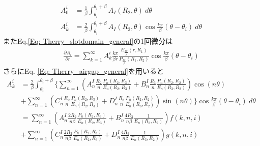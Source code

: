 \documentclass[a4paper, 11pt]{article}
\begin{document}
\begin{align}
    A_0^i &= \frac{1}{\beta} \int_{\theta_i}^{\theta_i+\beta} A_I (R_2,\theta) ~d\theta\\
    A_k^i &= \frac{2}{\beta} \int_{\theta_i}^{\theta_i+\beta} A_I (R_2,\theta)\cos \frac{k\pi}{\beta}(\theta-\theta_i)~d\theta
\end{align}
\color{NavyBlue}
またEq.\eqref{Eq: Therry_slotdomain_general}の1回微分は
\begin{align}
     \frac{\partial A_i}{\partial r}  = \sum_{k=1}^\infty A_k^i \frac{k\pi}{\beta r}\frac{E_{\frac{k\pi}{\beta}}(r,R_1)}{P_{\frac{k\pi}{\beta}}(R_1,R_2)}\cos \frac{k\pi}{\beta}(\theta-\theta_i)\label{Eq: Therry_slotdomain_general_deriv}
\end{align}
さらにEq. \eqref{Eq: Therry_airgap_general}を用いると
\begin{align}
     A_k^i &= \frac{2}{\beta} \int_{\theta_i}^{\theta_i+\beta} \bigg\{ \sum_{n=1}^\infty \left(A_n^I\frac{R_2}{n}\displaystyle \frac{P_n(R_2,R_3)}{E_n(R_2,R_3)} + B_n^I\frac{R_3}{n} \frac{P_n(R_2,R_2)}{E_n(R_3,R_2)} \right)\cos(n\theta) \nonumber \\ & + \sum_{n=1}^\infty \left(C_n^I\frac{R_2}{n}\displaystyle \frac{P_n(R_2,R_3)}{E_n(R_2,R_3)} + D_n^I\frac{R_3}{n} \frac{P_n(R_2,R_2)}{E_n(R_3,R_2)} \right)\sin(n\theta)\bigg\}\cos \frac{k\pi}{\beta}(\theta-\theta_i)~d\theta \nonumber\\
     & = \sum_{n=1}^\infty \left(A_n^I\frac{2R_2}{n\beta}\displaystyle \frac{P_n(R_2,R_3)}{E_n(R_2,R_3)} + B_n^I\frac{4R_3}{n\beta} \frac{1}{E_n(R_3,R_2)} \right)f(k,n,i) \nonumber \\ & + \sum_{n=1}^\infty \left(C_n^I\frac{2R_2}{n\beta}\displaystyle \frac{P_n(R_2,R_3)}{E_n(R_2,R_3)} + D_n^I\frac{4R_3}{n\beta} \frac{1}{E_n(R_3,R_2)} \right)g(k,n,i)
\end{align}

\color{Black}
\end{document}
